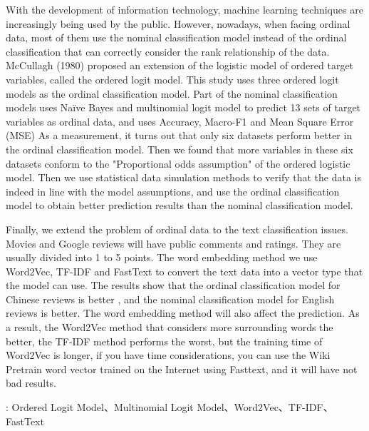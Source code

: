 	With the development of information technology, machine learning techniques are increasingly being used by the public. However, nowadays, when facing ordinal data, most of them use the nominal classification model instead of the ordinal classification that can correctly consider the rank relationship of the data. McCullagh (1980) proposed an extension of the logistic model of ordered target variables, called the ordered logit model. This study uses three ordered logit models as the ordinal classification model. Part of the nominal classification models uses Naïve Bayes and multinomial logit model to predict 13 sets of target variables as ordinal data, and uses Accuracy, Macro-F1 and Mean Square Error (MSE) As a measurement, it turns out that only six datasets perform better in the ordinal classification model. Then we found that more variables in these six datasets conform to the "Proportional odds assumption" of the ordered logistic model. Then we use statistical data simulation methods to verify that the data is indeed in line with the model assumptions, and use the ordinal classification model to obtain better prediction results than the nominal classification model.
	
    Finally, we extend the problem of ordinal data to the text classification issues. Movies and Google reviews will have public comments and ratings. They are usually divided into 1 to 5 points. The word embedding method we use Word2Vec, TF-IDF and FastText to convert the text data into a vector type that the model can use. The results show that the ordinal classification model for Chinese reviews is better , and the nominal classification model for English reviews is better. The word embedding method will also affect the prediction. As a result, the Word2Vec method that considers more surrounding words the better, the TF-IDF method performs the worst, but the training time of Word2Vec is longer, if you have time considerations, you can use the Wiki Pretrain word vector trained on the Internet using Fasttext, and it will have not bad results.

: Ordered Logit Model、Multinomial Logit Model、Word2Vec、TF-IDF、FastText

%


